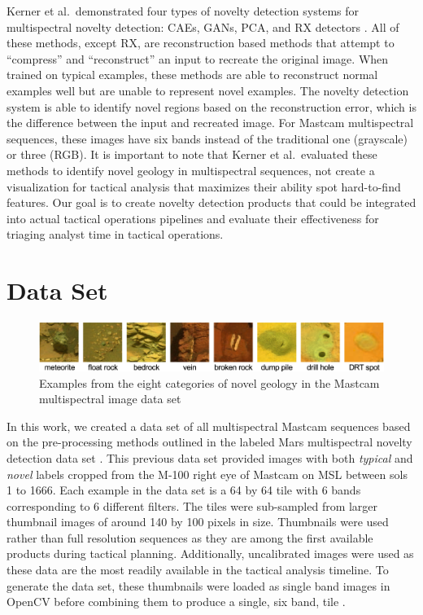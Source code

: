Kerner et al.~demonstrated four types of novelty detection systems for multispectral novelty detection: CAEs, GANs, PCA, and RX detectors \citep{kerner2020comparison}. 
All of these methods, except RX, are reconstruction based methods that attempt to ``compress'' and ``reconstruct'' an input to recreate the original image. 
When trained on typical examples, these methods are able to reconstruct normal examples well but are unable to represent novel examples.
The novelty detection system is able to identify novel regions based on the reconstruction error, which is the difference between the input and recreated image.
For Mastcam multispectral sequences, these images have six bands instead of the traditional one (grayscale) or three (RGB). 
It is important to note that Kerner et al.~evaluated these methods to identify novel geology in multispectral sequences, not create a visualization for tactical analysis that maximizes their ability spot hard-to-find features. 
Our goal is to create novelty detection products that could be integrated into actual tactical operations pipelines and evaluate their effectiveness for triaging analyst time in tactical operations.

\section{Data Set}
\begin{figure}
\centering
\includegraphics[width=\linewidth]{figs/msl/categories.png}
\caption[Novel Geology Categories for Mastcam Multispectral Images]{Examples from the eight categories of novel geology in the Mastcam multispectral image data set \protect\citep{kerner_data}} 
\label{msl/fig:NovelCategories}
\end{figure}

In this work, we created a data set of all multispectral Mastcam sequences based on the pre-processing methods outlined in the labeled Mars multispectral novelty detection data set \citep{kerner_data}.
This previous data set provided images with both \textit{typical} and \textit{novel} labels cropped from the M-100 right eye of Mastcam on MSL between sols 1 to 1666.
Each example in the data set is a 64 by 64 tile with 6 bands corresponding to 6 different filters.
The tiles were sub-sampled from larger thumbnail images of around 140 by 100 pixels in size. 
Thumbnails were used rather than full resolution sequences as they are among the first available products during tactical planning. 
Additionally, uncalibrated images were used as these data are the most readily available in the tactical analysis timeline. 
To generate the data set, these thumbnails were loaded as single band images in OpenCV before combining them to produce a single, six band, tile \citep{opencv_library}.

